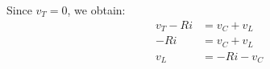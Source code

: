 \documentclass[preview]{standalone}
\begin{document}
\begin{center}
Since $v_T = 0$, we obtain: 
            \begin{align*}
                v_T - Ri &= v_C + v_L \\
                - Ri &= v_C + v_L \\
                v_L &= -Ri - v_C
            \end{align*}
\end{center}
\end{document}
